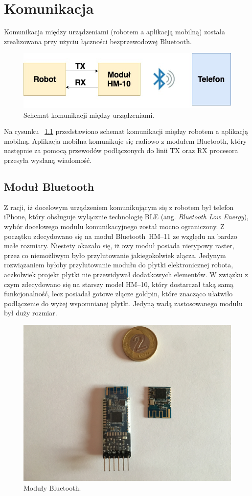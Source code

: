 \chapter{Komunikacja}
Komunikacja między urządzeniami (robotem a aplikacją mobilną) została zrealizowana przy użyciu łączności bezprzewodowej Bluetooth. 

\begin{figure}[H]
	\centering
		\includegraphics[width=0.75\linewidth]{pic03/bt_communications.jpg}
	\caption{Schemat komunikacji między urządzeniami.}
	\label{fig:communication}	
\end{figure}

Na rysunku ~\ref{fig:communication} przedstawiono schemat komunikacji między robotem a aplikacją mobilną. Aplikacja mobilna komunikuje się radiowo z modułem Bluetooth, który następnie za pomocą przewodów podłączonych do linii TX oraz RX procesora przesyła wysłaną wiadomość.   

\section{Moduł Bluetooth}
Z racji, iż docelowym urządzeniem komunikującym się z robotem był telefon iPhone, który obsługuje wyłącznie technologię BLE (ang. \textit{Bluetooth Low Energy}), wybór docelowego modułu komunikacyjnego został mocno ograniczony. Z początku zdecydowano się na moduł Bluetooth~HM–11 ze względu na bardzo małe rozmiary. Niestety okazało się, iż owy moduł posiada nietypowy raster, przez co niemożliwym było przylutowanie jakiegokolwiek złącza. Jedynym rozwiązaniem byłoby przylutowanie modułu do płytki elektronicznej robota, aczkolwiek projekt płytki nie przewidywał dodatkowych elementów. W związku z czym zdecydowano się na starszy model HM–10, który dostarczał taką samą funkcjonalność, lecz posiadał gotowe złącze goldpin, które znacząco ułatwiło podłączenie do wyżej wspomnianej płytki. Jedyną wadą zastosowanego modułu był duży rozmiar.

\begin{figure}[H]
	\centering
		\includegraphics[width=0.75\linewidth]{pic03/bt_modules.jpg}
	\caption{Moduły Bluetooth.}
	\label{fig:bt}	
\end{figure}

